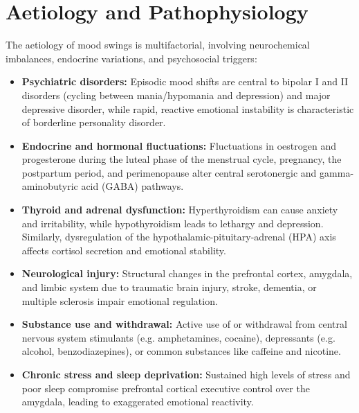 \section*{Aetiology and Pathophysiology}
The aetiology of mood swings is multifactorial, involving neurochemical imbalances, endocrine variations, and psychosocial triggers:
\begin{itemize}
    \item \textbf{Psychiatric disorders:} Episodic mood shifts are central to bipolar I and II disorders (cycling between mania/hypomania and depression) and major depressive disorder, while rapid, reactive emotional instability is characteristic of borderline personality disorder.
    \item \textbf{Endocrine and hormonal fluctuations:} Fluctuations in oestrogen and progesterone during the luteal phase of the menstrual cycle, pregnancy, the postpartum period, and perimenopause alter central serotonergic and gamma-aminobutyric acid (GABA) pathways.
    \item \textbf{Thyroid and adrenal dysfunction:} Hyperthyroidism can cause anxiety and irritability, while hypothyroidism leads to lethargy and depression. Similarly, dysregulation of the hypothalamic-pituitary-adrenal (HPA) axis affects cortisol secretion and emotional stability.
    \item \textbf{Neurological injury:} Structural changes in the prefrontal cortex, amygdala, and limbic system due to traumatic brain injury, stroke, dementia, or multiple sclerosis impair emotional regulation.
    \item \textbf{Substance use and withdrawal:} Active use of or withdrawal from central nervous system stimulants (e.g. amphetamines, cocaine), depressants (e.g. alcohol, benzodiazepines), or common substances like caffeine and nicotine.
    \item \textbf{Chronic stress and sleep deprivation:} Sustained high levels of stress and poor sleep compromise prefrontal cortical executive control over the amygdala, leading to exaggerated emotional reactivity.
\end{itemize}

